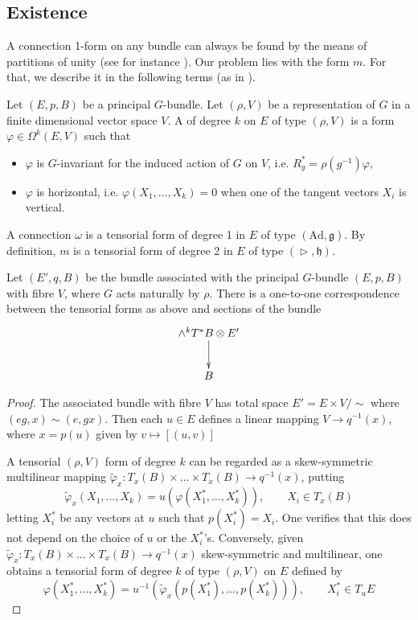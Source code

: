 \subsection{Existence}\label{existence}
A connection 1-form on any bundle can always be found by the means of partitions of unity (see for instance \cite[p. 67]{kobayashi1}). Our problem lies with the form $m$. For that, we describe it in the following terms (as in \cite[p. 75]{kobayashi1}).

\begin{definition}\label{tensdef}
Let $(E,p,B)$ be a principal $G$-bundle. Let $(\rho,V)$ be a representation of $G$ in a finite dimensional vector space $V$. A  of degree $k$ on $E$ of type $(\rho,V)$ is a form $\varphi\in\Omega^k (E,V)$ such that
\begin{itemize}
\item $\varphi$ is $G$-invariant for the induced action of $G$ on $V$, i.e. $R_g^*=\rho(g^{-1})\varphi$,
\item $\varphi$ is horizontal, i.e. $\varphi(X_1,\ldots,X_k)=0$ when one of the tangent vectors $X_i$ is vertical.
\end{itemize}
\end{definition}

\begin{example}\label{tensorialexample}
A connection $\omega$ is a tensorial form of degree 1 in $E$ of type $(\text{Ad},\mathfrak{g})$. By definition, $m$ is a tensorial form of degree 2 in $E$ of type $(\vartriangleright,\mathfrak{h})$.
\end{example}


\begin{lemma}\label{tensorialform}
Let $(E',q,B)$ be the bundle associated with the principal $G$-bundle $(E,p,B)$ with fibre $V$, where $G$ acts naturally by $\rho$. There is a one-to-one correspondence between the tensorial forms as above and sections of the bundle \[
\xymatrix{\wedge^k T^*B\otimes E' \ar[d]\\
B} \]
\end{lemma}

\begin{proof}
The associated bundle with fibre $V$ has total space $E'=E \times V / \sim$ where $(eg,x)\sim (e,gx)$. Then each $u\in E$ defines a linear mapping $V\rightarrow q^{-1}(x)$, where $x=p(u)$ given by $ v\mapsto [(u,v)] $


A tensorial $(\rho,V)$ form of degree $k$ can be regarded as a skew-symmetric multilinear mapping $\widetilde{\varphi}_x: T_x(B)\times \ldots \times T_x(B) \rightarrow q^{-1}(x)$, putting
\[
\widetilde{\varphi}_x(X_1,\ldots,X_k)=u(\varphi(X_1^*,\ldots, X_k^*)), \qquad X_i \in T_x(B)
\]letting $X_i^*$ be any vectors at $u$ such that $p(X_i^*)=X_i$. One verifies that this does not depend on the choice of $u$ or the $X_i^*$'s. Conversely, given $\widetilde{\varphi}_x:T_x(B)\times\ldots\times T_x(B)\rightarrow q^{-1}(x)$ skew-symmetric and multilinear, one obtains a tensorial form of degree $k$ of type $(\rho,V)$ on $E$ defined by
\[
\varphi(X_1^*,\ldots,X_k^*)=u^{-1}(\widetilde{\varphi}_x(p(X_1^*),\ldots,p(X_k^*))), \qquad X_i^*\in T_uE
\]
\end{proof}


